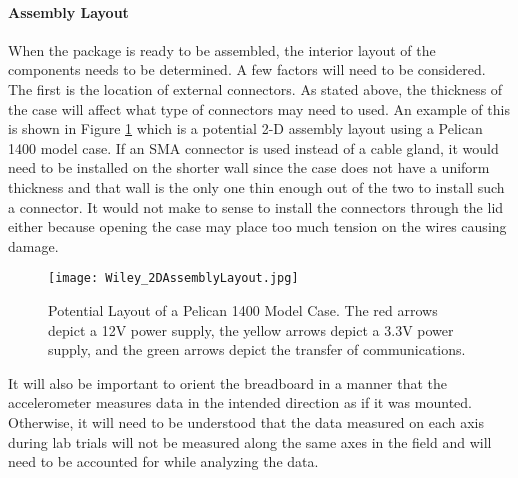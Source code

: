 \paragraph{Assembly Layout}
When the package is ready to be assembled, the interior layout of the components needs to be determined. A few factors will need to be considered. 
The first is the location of external connectors. As stated above, the thickness of the case will affect what type of connectors may need to used. 
An example of this is shown in Figure \ref{fig:Assembly} which is a potential 2-D assembly layout using a Pelican 1400 model case. If an SMA
connector is used instead of a cable gland, it would need to be installed on the shorter wall since the case does not have a uniform thickness and
that wall is the only one thin enough out of the two to install such a connector. It would not make to sense to install the connectors through
the lid either because opening the case may place too much tension on the wires causing damage. 

\begin{figure}[h]
\centering
\texttt{[image: Wiley\_2DAssemblyLayout.jpg]}
\caption{Potential Layout of a Pelican 1400 Model Case.
The red arrows depict a 12V power supply, the yellow arrows depict a 3.3V power supply, and the green arrows depict the transfer of communications.}
\label{fig:Assembly}
\end{figure}

It will also be important to orient the breadboard in a manner that the accelerometer measures data in the intended direction as if it was mounted. 
Otherwise, it will need to be understood that the data measured on each axis during lab trials will not be measured along the same axes in the field and
will need to be accounted for while analyzing the data. 
